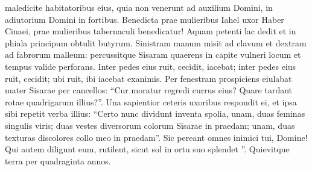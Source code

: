 \begin{biblechapter}
\begin{biblechapter}
\begin{biblechapter}
\begin{biblechapter}
\begin{biblechapter}
 maledicite habitatoribus eius,
 quia non venerunt ad auxilium Domini,
 in adiutorium Domini in fortibus.
 \verse Benedicta prae mulieribus Iahel uxor Haber Cinaei,
 prae mulieribus tabernaculi benedicatur!
 \verse Aquam petenti lac dedit
 et in phiala principum obtulit butyrum.
 \verse Sinistram manum misit ad clavum
 et dextram ad fabrorum malleum:
 percussitque Sisaram quaerens in capite vulneri locum
 et tempus valide perforans.
 \verse Inter pedes eius ruit, cecidit, iacebat;
 inter pedes eius ruit, cecidit;
 ubi ruit, ibi iacebat exanimis.
 \verse Per fenestram prospiciens eiulabat
 mater Sisarae per cancellos:
 “Cur moratur regredi currus eius? Quare tardant rotae quadrigarum illius?”.
 \verse Una sapientior ceteris uxoribus respondit ei,
 et ipsa sibi repetit verba illius:
 \verse “Certo nunc dividunt inventa spolia, unam, duas feminas singulis viris;
 duas vestes diversorum colorum
 Sisarae in praedam;
 unam, duas texturas discolores
 collo meo in praedam”.
 \verse Sic pereant omnes inimici tui, Domine!
 Qui autem diligunt eum, rutilent,
 sicut sol in ortu suo splendet ”.
 \verse Quievitque terra per quadraginta annos.
 

\end{biblechapter}
\end{biblechapter}
\end{biblechapter}
\end{biblechapter}
\end{biblechapter}
